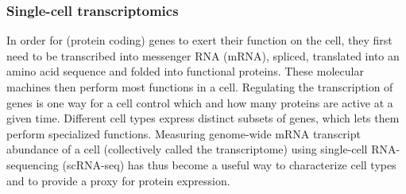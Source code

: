 

\subsubsection{Single-cell transcriptomics}


In order for (protein coding) genes to exert their function on the cell, they first need to be transcribed into messenger RNA (mRNA), spliced, translated into an amino acid sequence and folded into functional proteins. These molecular machines then perform most functions in a cell. Regulating the transcription of genes is one way for a cell control which and how many proteins are active at a given time. Different cell types express distinct subsets of genes, which lets them perform specialized functions. Measuring genome-wide mRNA transcript abundance of a cell (collectively called the transcriptome) using single-cell RNA-sequencing (scRNA-seq) has thus become a useful way to characterize cell types and to provide a proxy for protein expression. 


